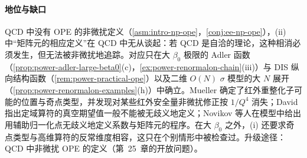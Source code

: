 \paragraph{地位与缺口}
QCD 中没有 OPE 的非微扰定义（\cref{asm:intro-np-ope}，\cref{conj:ee-np-ope}），(ii) 中“矩阵元的相应定义”在 QCD 中无从谈起：若 QCD 是自洽的理论，这种相消必须发生，但无法被非微扰地追踪\cite[第~4.2.1~节]{Beneke1999}。对应只在大 $\beta_0$ 极限的 Adler 函数（\cref{prop:power-adler-large-beta0}(c)，\cref{ex:power-renormalon-chain}(iii)）与 DIS 纵向结构函数（\cref{rem:power-practical-ope}）以及二维 $O(N)$ $\sigma$ 模型的大 $N$ 展开（\cref{prop:power-renormalon-examples}(h)）中确立。Mueller 确定了红外重整化子可能的位置与奇点类型，并发现对某些红外安全量非微扰修正按 $1/Q^4$ 消失\cite{Mueller1985}；David 指出定域算符的真空期望值一般不能被无歧义地定义\cite{David:1983gz,David:1985xj}；Novikov 等人在模型中给出用辅助归一化点无歧义地定义系数与矩阵元的程序\cite{Novikov:1984rf}。在大 $\beta_0$ 之外，(i) 还要求奇点类型与高维算符的反常维度相容，这只在个别情形中被检查过\cite[第~5.2.1~节]{Beneke1999}。升级途径：QCD 中非微扰 OPE 的定义（第~25~章的开放问题）。
